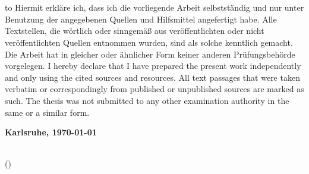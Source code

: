 \chapter*{}
\vspace*{\fill}
\hbox to \textwidth{\hrulefill}
{}
  {Hiermit erkl\"{a}re ich, dass ich die vorliegende Arbeit selbstst\"{a}ndig und nur unter Benutzung der angegebenen Quellen und Hilfsmittel angefertigt habe. Alle Textstellen, die w\"{o}rtlich oder sinngem\"{a}{\ss} aus ver\"{o}ffentlichten oder nicht ver\"{o}ffentlichten Quellen entnommen wurden, sind als solche kenntlich gemacht. Die Arbeit hat in gleicher oder \"{a}hnlicher Form keiner anderen Pr\"{u}fungsbeh\"{o}rde vorgelegen.}
  {I hereby declare that I have prepared the present work independently and only using the cited sources and resources. All text passages that were taken verbatim or correspondingly from published or unpublished sources are marked as such. The thesis was not submitted to any other examination authority in the same or a similar form.}

\textbf{Karlsruhe, \today}
\vspace{1.5cm}

\dotfill\hspace*{8.0cm}\\
\hspace*{2cm}(\textbf{\theauthor}) %
\let\cleardoublepage\clearpage

